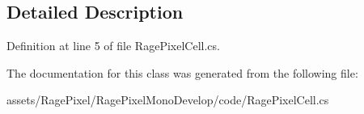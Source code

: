 \subsection{Detailed Description}


Definition at line 5 of file Rage\-Pixel\-Cell.\-cs.



The documentation for this class was generated from the following file\-:\begin{DoxyCompactItemize}
\item 
assets/\-Rage\-Pixel/\-Rage\-Pixel\-Mono\-Develop/code/Rage\-Pixel\-Cell.\-cs\end{DoxyCompactItemize}
